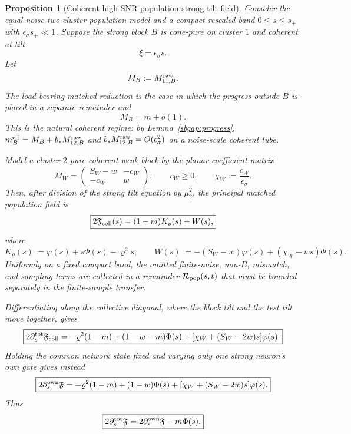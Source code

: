 \documentclass{article} %
\theoremstyle{plain}
\newtheorem{proposition}[theorem]{Proposition}
\theoremstyle{definition}
\theoremstyle{remark}
\begin{document}
\begin{proposition}[Coherent high-SNR population strong-tilt field]
\label{sbcoh:population-field}
Consider the equal-noise two-cluster population model and a compact rescaled
band $0\le s\le s_+$ with $\epsilon_\sigma s_+\ll1$.  Suppose the strong
block $B$ is cone-pure on cluster $1$ and coherent at tilt
\[
 \xi=\epsilon_\sigma s.
\]
Let
\[
 M_B:=M_{11,B}^{\rm raw}.
\]
The load-bearing matched reduction is the case in which the progress outside
$B$ is placed in a separate remainder and
\begin{equation}\label{sbcoh:matched-progress}
 M_B=m+o(1).
\end{equation}
This is the natural coherent regime: by Lemma~\ref{sbgap:progress},
$m_B^{\rm eff}=M_B+b_*M_{12,B}^{\rm raw}$ and
$b_*M_{12,B}^{\rm raw}=O(\epsilon_\sigma^2)$ on a noise-scale coherent tube.

Model a cluster-$2$-pure coherent weak block by the planar coefficient matrix
\[
 M_W=
 \begin{pmatrix}
 S_W-w&-c_W\\
 -c_W&w
 \end{pmatrix},
 \qquad
 c_W\ge0,
 \qquad
 \chi_W:=\frac{c_W}{\epsilon_\sigma}.
\]
Then, after division of the strong tilt equation by $\mu_2^2$, the principal
matched population field is
\begin{equation}\label{sbcoh:C1}
 \boxed{
 2\mathfrak F_{\rm coll}(s)
 =(1-m)K_\varrho(s)+W(s),
 }
\end{equation}
where
\begin{equation}\label{sbcoh:C2}
 K_\varrho(s):=\varphi(s)+s\Phi(s)-\varrho^2s,
 \qquad
 W(s):=-(S_W-w)\varphi(s)+(\chi_W-ws)\Phi(s).
\end{equation}
Uniformly on a fixed compact band, the omitted finite-noise, non-$B$, mismatch,
and sampling terms are collected in a remainder
$\mathcal R_{\rm pop}(s,t)$ that must be bounded separately in the finite-sample
transfer.

Differentiating along the collective diagonal, where the block tilt and the
test tilt move together, gives
\begin{equation}\label{sbcoh:C3}
 \boxed{
 2\partial_s^{\rm tot}\mathfrak F_{\rm coll}
 =-\varrho^2(1-m)
 +(1-w-m)\Phi(s)
 +[\chi_W+(S_W-2w)s]\varphi(s).
 }
\end{equation}
Holding the common network state fixed and varying only one strong neuron's
own gate gives instead
\begin{equation}\label{sbcoh:own-partial}
 \boxed{
 2\partial_s^{\rm own}\mathfrak F
 =-\varrho^2(1-m)
 +(1-w)\Phi(s)
 +[\chi_W+(S_W-2w)s]\varphi(s).
 }
\end{equation}
Thus
\begin{equation}\label{sbcoh:own-total-split}
 \boxed{
 2\partial_s^{\rm tot}\mathfrak F
 =2\partial_s^{\rm own}\mathfrak F-m\Phi(s).
 }
\end{equation}
\end{proposition}
\end{document}
